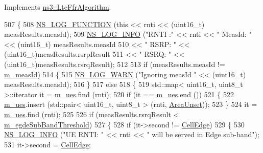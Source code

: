 Implements \hyperlink{classns3_1_1LteFfrAlgorithm_aae66b1b7edbacf07b96e171d89de3f91}{ns3\+::\+Lte\+Ffr\+Algorithm}.


\begin{DoxyCode}
507 \{
508   \hyperlink{log-macros-disabled_8h_a90b90d5bad1f39cb1b64923ea94c0761}{NS\_LOG\_FUNCTION} (\textcolor{keyword}{this} << rnti << (uint16\_t) measResults.measId);
509   \hyperlink{group__logging_gafbd73ee2cf9f26b319f49086d8e860fb}{NS\_LOG\_INFO} (\textcolor{stringliteral}{"RNTI :"} << rnti << \textcolor{stringliteral}{" MeasId: "} << (uint16\_t) measResults.measId
510                         << \textcolor{stringliteral}{" RSRP: "} << (uint16\_t)measResults.rsrpResult
511                         << \textcolor{stringliteral}{" RSRQ: "} << (uint16\_t)measResults.rsrqResult);
512 
513   \textcolor{keywordflow}{if} (measResults.measId != \hyperlink{classns3_1_1LteFrSoftAlgorithm_acc3523f48f9fa0fcdec80850c1c13568}{m\_measId})
514     \{
515       \hyperlink{group__logging_gade7208b4009cdf0e25783cd26766f559}{NS\_LOG\_WARN} (\textcolor{stringliteral}{"Ignoring measId "} << (uint16\_t) measResults.measId);
516     \}
517   \textcolor{keywordflow}{else}
518     \{
519       std::map< uint16\_t, uint8\_t >::iterator it = \hyperlink{classns3_1_1LteFrSoftAlgorithm_a571117042ed967faa798f96b0200e84e}{m\_ues}.find (rnti);
520       \textcolor{keywordflow}{if} (it == \hyperlink{classns3_1_1LteFrSoftAlgorithm_a571117042ed967faa798f96b0200e84e}{m\_ues}.end ())
521         \{
522           \hyperlink{classns3_1_1LteFrSoftAlgorithm_a571117042ed967faa798f96b0200e84e}{m\_ues}.insert (std::pair< uint16\_t, uint8\_t > (rnti, \hyperlink{classns3_1_1LteFrSoftAlgorithm_a8ec0c327bae4119de159dccccb90d029a1bc0168b37cb032c5efad2869ea950e7}{AreaUnset}));
523         \}
524       it = \hyperlink{classns3_1_1LteFrSoftAlgorithm_a571117042ed967faa798f96b0200e84e}{m\_ues}.find (rnti);
525 
526       \textcolor{keywordflow}{if} (measResults.rsrqResult < \hyperlink{classns3_1_1LteFrSoftAlgorithm_ab06a0ac550999e2144a3169ad8879914}{m\_egdeSubBandThreshold})
527         \{
528           \textcolor{keywordflow}{if} (it->second != \hyperlink{classns3_1_1LteFrSoftAlgorithm_a8ec0c327bae4119de159dccccb90d029adf66a42bcef8dc451a9349295ab1401c}{CellEdge})
529             \{
530               \hyperlink{group__logging_gafbd73ee2cf9f26b319f49086d8e860fb}{NS\_LOG\_INFO} (\textcolor{stringliteral}{"UE RNTI: "} << rnti << \textcolor{stringliteral}{" will be served in Edge sub-band"});
531               it->second = \hyperlink{classns3_1_1LteFrSoftAlgorithm_a8ec0c327bae4119de159dccccb90d029adf66a42bcef8dc451a9349295ab1401c}{CellEdge};

\end{DoxyCode}
